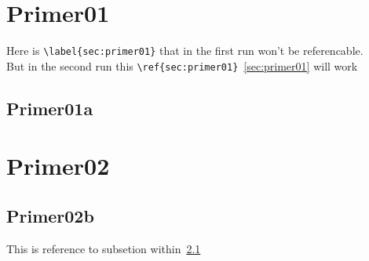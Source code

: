\documentclass[12pt]{article}
\begin{document}
\section{Primer01}
Here is \verb|\label{sec:primer01}| \label{sec:primer01}  that in the first run won't be referencable.\\
But in the second run this \verb|\ref{sec:primer01}|~\ref{sec:primer01} will work

\subsection{Primer01a}

\section{Primer02}

\subsection{Primer02b}
\label{sec:primer02sub}
This is reference to subsetion within~\ref{sec:primer02sub}
\end{document}
